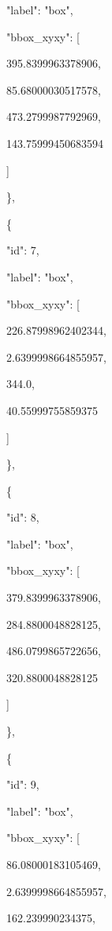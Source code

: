 \documentclass[10pt,a4paper]{article}
\begin{document}
      "label":\allowbreak{} "box",\allowbreak{}\par
      "bbox\_xyxy":\allowbreak{} [\par
        395.8399963378906,\allowbreak{}\par
        85.68000030517578,\allowbreak{}\par
        473.2799987792969,\allowbreak{}\par
        143.75999450683594\par
      ]\par
    \},\allowbreak{}\par
    \{\par
      "id":\allowbreak{} 7,\allowbreak{}\par
      "label":\allowbreak{} "box",\allowbreak{}\par
      "bbox\_xyxy":\allowbreak{} [\par
        226.87998962402344,\allowbreak{}\par
        2.6399998664855957,\allowbreak{}\par
        344.0,\allowbreak{}\par
        40.55999755859375\par
      ]\par
    \},\allowbreak{}\par
    \{\par
      "id":\allowbreak{} 8,\allowbreak{}\par
      "label":\allowbreak{} "box",\allowbreak{}\par
      "bbox\_xyxy":\allowbreak{} [\par
        379.8399963378906,\allowbreak{}\par
        284.8800048828125,\allowbreak{}\par
        486.0799865722656,\allowbreak{}\par
        320.8800048828125\par
      ]\par
    \},\allowbreak{}\par
    \{\par
      "id":\allowbreak{} 9,\allowbreak{}\par
      "label":\allowbreak{} "box",\allowbreak{}\par
      "bbox\_xyxy":\allowbreak{} [\par
        86.08000183105469,\allowbreak{}\par
        2.6399998664855957,\allowbreak{}\par
        162.239990234375,\allowbreak{}\par
\end{document}

